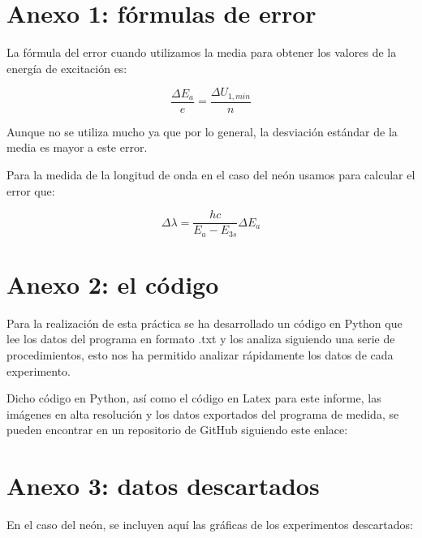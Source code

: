 \documentclass{article}
\begin{document}
\section{Anexo 1: fórmulas de error}

La fórmula del error cuando utilizamos la media para obtener los valores de la energía de excitación es:

$$
\frac{\Delta E_a}{e} = \frac{\Delta U_{1, min}}{n}
$$

Aunque no se utiliza mucho ya que por lo general, la desviación estándar de la media es mayor a este error.

Para la medida de la longitud de onda en el caso del neón usamos para calcular el error que:

$$
\Delta \lambda = \frac{hc}{E_a - E_{3s}} \Delta E_a
$$

\section{Anexo 2: el código}

Para la realización de esta práctica se ha desarrollado un código en Python que lee los datos del programa en formato .txt y los analiza siguiendo una serie de procedimientos, esto nos ha permitido analizar rápidamente los datos de cada experimento.

Dicho código en Python, así como el código en Latex para este informe, las imágenes en alta resolución y los datos exportados del programa de medida, se pueden encontrar en un repositorio de GitHub siguiendo este enlace:

\section{Anexo 3: datos descartados}

En el caso del neón, se incluyen aquí las gráficas de los experimentos descartados:
\end{document}
